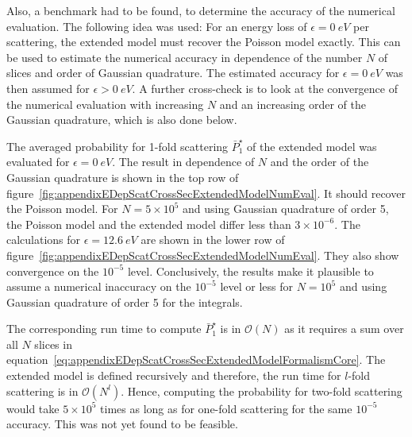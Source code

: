 Also, a benchmark had to be found, to determine the accuracy of the numerical evaluation. The following idea was used: For an energy loss of $\epsilon=\SI{0}{eV}$ per scattering, the extended model must recover the Poisson model exactly. This can be used to estimate the numerical accuracy in dependence of the number $N$ of slices and order of Gaussian quadrature. The estimated accuracy for $\epsilon=\SI{0}{eV}$ was then assumed for $\epsilon>\SI{0}{eV}$. A further cross-check is to look at the convergence of the numerical evaluation with increasing $N$ and an increasing order of the Gaussian quadrature, which is also done below.

The averaged probability for 1-fold scattering $\bar{P}^{\star}_1$ of the extended model was evaluated for $\epsilon=\SI{0}{eV}$. The result in dependence of $N$ and the order of the Gaussian quadrature is shown in the top row of figure~\ref{fig:appendixEDepScatCrossSecExtendedModelNumEval}. It should recover the Poisson model. For $N=5\times10^5$ and using Gaussian quadrature of order 5, the Poisson model and the extended model differ less than $3\times10^{-6}$. The calculations for $\epsilon=\SI{12.6}{eV}$ are shown in the lower row of figure~\ref{fig:appendixEDepScatCrossSecExtendedModelNumEval}. They also show convergence on the $10^{-5}$ level. Conclusively, the results make it plausible to assume a numerical inaccuracy on the $10^{-5}$ level or less for $N=10^5$ and using Gaussian quadrature of order 5 for the integrals.

The corresponding run time to compute $\bar{P}^{\star}_1$ is in $\mathcal{O}(N)$ as it requires a sum over all $N$ slices in equation~\ref{eq:appendixEDepScatCrossSecExtendedModelFormalismCore}. The extended model is defined recursively and therefore, the run time for $l$-fold scattering is in $\mathcal{O}(N^l)$. Hence, computing the probability for two-fold scattering would take $5\times10^5$ times as long as for one-fold scattering for the same $10^{-5}$ accuracy. This was not yet found to be feasible.
\FloatBarrier

